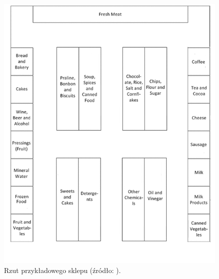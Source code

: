 \begin{figure}[H]
\centering
\begin{minipage}{0.45\linewidth}
\centering
\includegraphics[width=\textwidth]{images/rzut_sklepu.png}
\caption{Rzut przykładowego sklepu (źródło: \cite{woeginger2016}).}
\label{fig:rzut_sklepu}
\end{minipage}
\hfill
\begin{minipage}{0.45\linewidth}
\centering

\end{minipage}
\end{figure}
